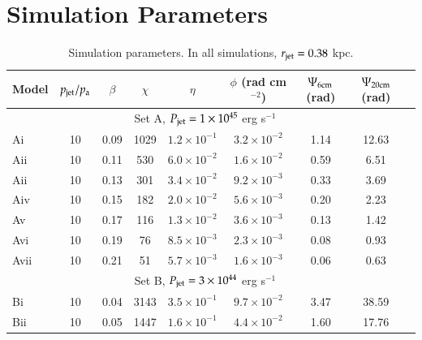 
%
%
\section{Simulation Parameters} \label{code}

\begin{table}
\caption{Simulation parameters. In all simulations, $r_{\rm{jet}}=0.38$ kpc.}
\centering
\begin{tabular}{l * {8}{c}}
\hline \hline
Model  & $p_{\rm{jet}}/p_{\rm{a}}$ & $\beta$ & $\chi$ & $\eta$ & $\phi$ (rad cm$^{-2}$) & $\Psi_{6\rm{cm}}$ (rad) & $\Psi_{20\rm{cm}}$ (rad) \\
\hline
	\multicolumn{8}{c}{Set A, $P_{\rm{jet}}=1\times10^{45}$ erg s$^{-1}$} \\ 
	\hline
  	 Ai		&  10 & 0.09 & 1029 & $1.2\times10^{-1}$ &	$3.2\times10^{-2}$ 			&	1.14	 		&	12.63  \\
	Aii 	&  10 & 0.11 &  530  &  $6.0\times10^{-2}$ &	$1.6\times10^{-2}$	 		&	0.59	 		& 6.51	 \\
	Aii	&  10 & 0.13 &   301 & $3.4\times10^{-2}$ &	$9.2\times10^{-3}$ 	 		&	0.33 	 		&   3.69	 \\
	Aiv	&  10 &  0.15 &  182 & $2.0\times10^{-2}$ &	$5.6\times10^{-3}$			&	0.20	 		& 	2.23	\\
	Av	&  10 & 0.17 &  116 & $1.3\times10^{-2}$  &	$3.6\times10^{-3}$	  		&	0.13			&  1.42	\\
	Avi 	&  10 &  0.19   &    76 &  $8.5\times10^{-3}$ &	$2.3\times10^{-3}$ 			& 0.08	  		& 0.93 \\
	Avii	&  10 &  0.21   &    51 &  $5.7\times10^{-3}$ &	$1.6\times10^{-3}$			&   0.06			& 0.63	 \\
	\hline
	\multicolumn{8}{c}{Set B, $P_{\rm{jet}}=3\times10^{44}$ erg s$^{-1}$} \\ 
	\hline 
	Bi	&10 & 0.04 & 3143  & $3.5\times10^{-1}$	&	$9.7\times10^{-2}$			& 3.47	 	& 38.59 \\
	Bii 	&  10 & 0.05 &   1447 & 	$1.6\times10^{-1}$ &	$4.4\times10^{-2}$	 	& 1.60	 	& 17.76	\\

\end{tabular}
\end{table}

